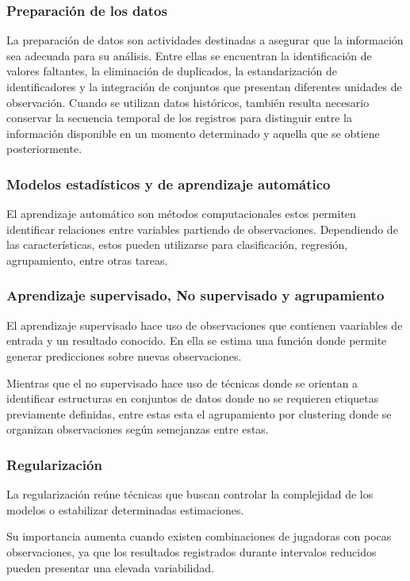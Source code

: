 \subsubsection{Preparación de los datos}
La preparación de datos son actividades destinadas a asegurar que la información sea adecuada para su análisis. Entre ellas se encuentran la identificación de valores faltantes, la eliminación de duplicados, la estandarización de identificadores y la integración de conjuntos que presentan diferentes unidades de observación. Cuando se utilizan datos históricos, también resulta necesario conservar la secuencia temporal de los registros para distinguir entre la información disponible en un momento determinado y aquella que se obtiene posteriormente.
\cite{bishop2006pattern}
\subsubsection{Modelos estadísticos y de aprendizaje automático}
El aprendizaje automático son métodos computacionales estos permiten identificar relaciones entre variables partiendo de observaciones. Dependiendo de las características, estos pueden utilizarse para clasificación, regresión, agrupamiento, entre otras tareas.
\cite{bishop2006pattern}
\subsubsection{Aprendizaje supervisado, No supervisado y agrupamiento}
El aprendizaje supervisado hace uso de observaciones que contienen vaariables de entrada y un resultado conocido. En ella se estima una función donde permite generar predicciones sobre nuevas observaciones.

Mientras que el no supervisado hace uso de técnicas donde se orientan a identificar estructuras en conjuntos de datos donde no se requieren etiquetas previamente definidas, entre estas esta el agrupamiento por clustering donde se organizan observaciones según semejanzas entre estas.

\cite{bishop2006pattern}
\subsubsection{Regularización}
La regularización reúne técnicas que buscan controlar la complejidad de los modelos o estabilizar determinadas estimaciones.

Su importancia aumenta cuando existen combinaciones de jugadoras con pocas observaciones, ya que los resultados registrados durante intervalos reducidos pueden presentar una elevada variabilidad.
\cite{zuccolotto2020basketball}

